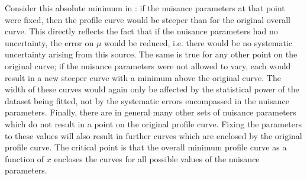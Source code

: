 Consider this absolute minimum in \nll: if the nuisance parameters at that
point were fixed, then the \nll profile curve would be steeper than for
the original overall \nll curve. This directly reflects the fact that
if the nuisance parameters had no uncertainty,
the error on $\mu$ would be reduced, i.e. there would be no systematic 
uncertainty arising from this source.
The same is true for any other point on the original curve; if the nuisance
parameters were not allowed to vary, each would result in a new steeper curve
with a minimum above the original curve.
The width of these curves would again only be affected by the statistical
power of the dataset being fitted, not by the systematic errors encompassed
in the nuisance parameters.
Finally, there are in general
many other sets of nuisance parameters which do not result in a point on the
original profile curve. Fixing the parameters to these values will also result
in further curves which are enclosed by the original profile curve.
The critical point is that the overall \nll minimum profile curve as a function
of $x$ encloses the curves for all possible values of the nuisance
parameters.


